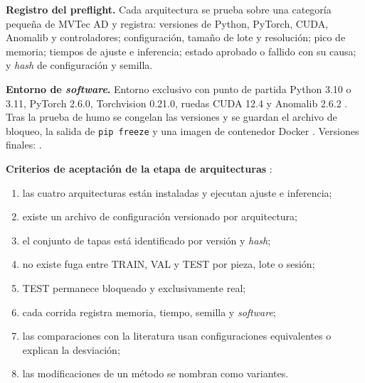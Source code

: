 \documentclass[12pt,oneside]{report}
\begin{document}
\noindent\textbf{Registro del preflight.} Cada arquitectura se prueba sobre una categoría pequeña de MVTec AD y registra: versiones de Python, PyTorch, CUDA, Anomalib y controladores; configuración, tamaño de lote y resolución; pico de memoria; tiempos de ajuste e inferencia; estado aprobado o fallido con su causa; y \textit{hash} de configuración y semilla.

\noindent\textbf{Entorno de \textit{software}.} Entorno exclusivo con punto de partida Python 3.10 o 3.11, PyTorch 2.6.0, Torchvision 0.21.0, ruedas CUDA 12.4 y Anomalib 2.6.2 \cite{paez2026}. Tras la prueba de humo se congelan las versiones y se guardan el archivo de bloqueo, la salida de \texttt{pip freeze} y una imagen de contenedor Docker \cite{merkel2014}. Versiones finales: .

\noindent\textbf{Criterios de aceptación de la etapa de arquitecturas} \cite{paez2026}:
\begin{enumerate}[leftmargin=2cm]
  \item las cuatro arquitecturas están instaladas y ejecutan ajuste e inferencia;
  \item existe un archivo de configuración versionado por arquitectura;
  \item el conjunto de tapas está identificado por versión y \textit{hash};
  \item no existe fuga entre TRAIN, VAL y TEST por pieza, lote o sesión;
  \item TEST permanece bloqueado y exclusivamente real;
  \item cada corrida registra memoria, tiempo, semilla y \textit{software};
  \item las comparaciones con la literatura usan configuraciones equivalentes o explican la desviación;
  \item las modificaciones de un método se nombran como variantes.
\end{enumerate}
\end{document}
